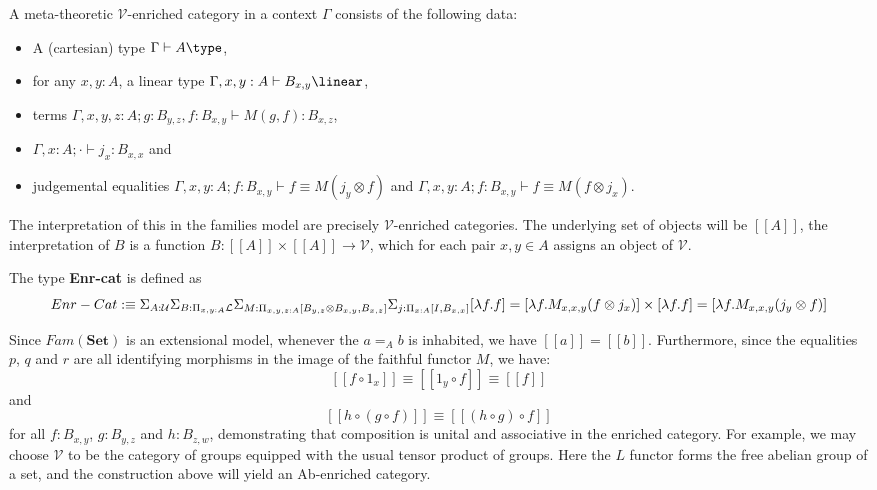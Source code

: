 \begin{defn}
  A meta-theoretic $\mathcal{V}$-enriched category in a context $\Gamma$ consists of the following data:
 \begin{itemize}
\item A (cartesian) type $\Gamma \vdash A \type$,
\item for any $x, y : A$, a linear type $\Gamma, x, y : A \vdash B_{x, y} \linear$,
\item terms $\Gamma, x, y, z : A; g: B_{y, z}, f:  B_{x, y} \vdash M(g, f) : B_{x, z}$,
\item $\Gamma, x : A; \cdot \vdash j_x : B_{x, x}$ and
\item judgemental equalities $\Gamma, x, y : A; f : B_{x, y} \vdash f \equiv M(j_y \otimes f)$ and $\Gamma, x, y : A; f : B_{x, y} \vdash f \equiv M(f \otimes j_x)$.
\end{itemize}
\end{defn}
The interpretation of this in the families model are precisely $\mathcal{V}$-enriched categories. The underlying set of objects will be $[[A]]$, the interpretation of $B$ is a function $B : [[A]] \times [[A]] \to \mathcal{V}$, which for each pair $x, y \in A$ assigns an object of $\mathcal{V}$. 
\begin{defn}
  The type \textbf{Enr-cat} is defined as
  \[
    Enr-Cat :\equiv \Sigma_{A : \mathcal{U}} \Sigma_{B : \Pi_{x, y : A}\mathcal{L}} \Sigma_{M : \Pi_{x, y, z : A} [B_{y, z} \otimes B_{x, y}, B_{x,z}]} \Sigma_{j : \Pi_{x: A}[I, B_{x, x}]}[\lambda f. f] = [\lambda f. M_{x, x, y}(f \otimes j_x)] \times [\lambda f. f] = [\lambda f. M_{x, x, y}(j_y \otimes f)] \\
  \]
\end{defn}
Since $Fam(\mathbf{Set})$ is an extensional model, whenever the $a =_A b$ is inhabited, we have $[[a]]=[[b]]$. Furthermore, since the equalities $p$, $q$ and $r$ are all identifying morphisms in the image of the faithful functor $M$, we have:
\[
[[f \circ 1_x ]] \equiv [[1_y \circ f]] \equiv [[f]]
\]
and
\[
[[h \circ (g \circ f)]] \equiv [[(h \circ g) \circ f]]
\]
for all $f : B_{x,y}$, $g : B_{y,z}$ and $h : B_{z,w}$, demonstrating that composition is unital and associative in the enriched category.
For example, we may choose $\mathcal{V}$ to be the category of groups equipped with the usual tensor product of groups. Here the $L$ functor forms the free abelian group of a set, and the construction above will yield an Ab-enriched category.
